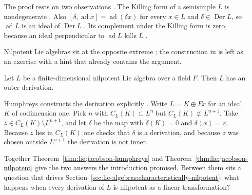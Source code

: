 The proof rests on two observations \cite[p.~23]{Humphreys1972}. The Killing
form of a semisimple $L$ is nondegenerate \cite[p.~23]{Humphreys1972}. Also
$[\delta,\operatorname{ad} x]=\operatorname{ad}(\delta x)$ for every $x\in L$
and $\delta\in\operatorname{Der} L$, so $\operatorname{ad} L$ is an ideal of
$\operatorname{Der} L$ \cite[p.~23]{Humphreys1972}. Its complement under the
Killing form is zero, because an ideal perpendicular to $\operatorname{ad} L$
kills $L$ \cite[p.~23]{Humphreys1972}.

Nilpotent Lie algebras sit at the opposite extreme
\cite[Exercise~10, p.~14]{Humphreys1972}; the construction in
\cite[p.~14]{Humphreys1972} is left as an exercise with a hint that
already contains the argument.

\begin{theorem}\label{thm:lie:jacobson-nilpotent}
Let $L$ be a finite-dimensional nilpotent Lie algebra over a field $F$.
Then $L$ has an outer derivation.
\end{theorem}

Humphreys constructs the derivation explicitly
\cite[p.~14]{Humphreys1972}.  Write $L=K\oplus Fx$ for an ideal $K$ of
codimension one.  Pick $n$ with $C_L(K)\subset L^n$ but
$C_L(K)\not\subset L^{n+1}$.  Take $z\in C_L(K)\setminus L^{n+1}$, and
let $\delta$ be the map with $\delta(K)=0$ and $\delta(x)=z$.  Because $z$
lies in $C_L(K)$ one checks that $\delta$ is a derivation, and because $z$
was chosen outside $L^{n+1}$ the derivation is not inner.

Together Theorem~\ref{thm:lie:jacobson-humphreys} and
Theorem~\ref{thm:lie:jacobson-nilpotent} give the two answers the
introduction promised.  Between them sits a question that drives
Section~\ref{sec:lie-algebras:characteristically-nilpotent}: what happens
when every derivation of $L$ is nilpotent as a linear transformation?
